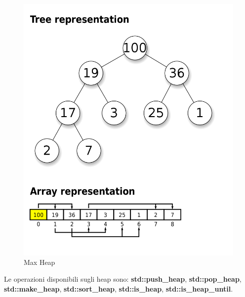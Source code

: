 \begin{figure}[H]
	\centering
	\includegraphics[width=1\textwidth, height=1\textheight, keepaspectratio]{./imgs/Algorithm_Library/Max-Heap.png}
	\caption{Max Heap}
	\label{fig:max-heap}
\end{figure}

\textsf{\small Le operazioni disponibili sugli heap sono: \textbf{std::push\_heap}, \textbf{std::pop\_heap}, \textbf{std::make\_heap}, \textbf{std::sort\_heap}, \textbf{std::is\_heap}, \textbf{std::is\_heap\_until}.} \\

